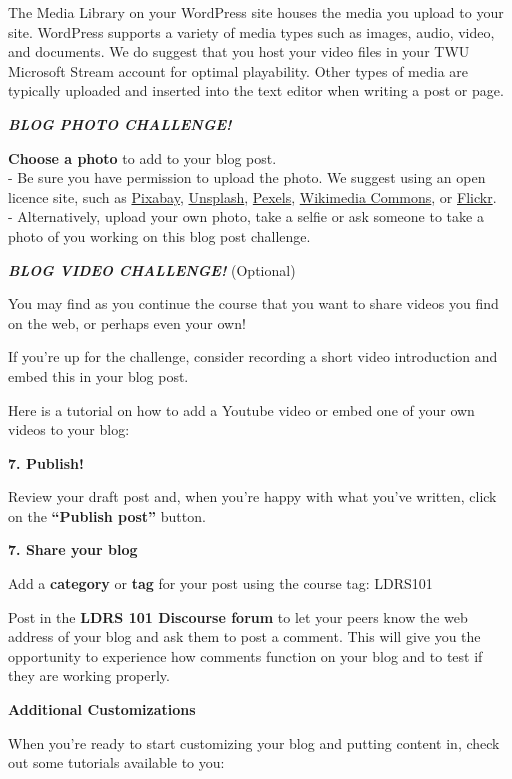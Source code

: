 \documentclass[
]{book}
\theoremstyle{definition}
\theoremstyle{definition}
\theoremstyle{definition}
\theoremstyle{definition}
\theoremstyle{remark}
\begin{document}
\begin{reflect}
The Media Library on your WordPress site houses the media you upload to your site. WordPress supports a variety of media types such as images, audio, video, and documents. We do suggest that you host your video files in your TWU Microsoft Stream account for optimal playability. Other types of media are typically uploaded and inserted into the text editor when writing a post or page.

\textbf{\emph{BLOG PHOTO CHALLENGE!}}

\textbf{Choose a photo} to add to your blog post.\\
- Be sure you have permission to upload the photo. We suggest using an open licence site, such as \href{https://pixabay.com/}{Pixabay}, \href{https://unsplash.com/}{Unsplash}, \href{https://www.pexels.com/}{Pexels}, \href{https://commons.wikimedia.org/wiki/Main_Page}{Wikimedia Commons}, or \href{https://www.flickr.com/search/?text=pho\&license=2\%2C3\%2C4\%2C5\%2C6\%2C9}{Flickr}.\\
- Alternatively, upload your own photo, take a selfie or ask someone to take a photo of you working on this blog post challenge.

\textbf{\emph{BLOG VIDEO CHALLENGE!}} (Optional)

You may find as you continue the course that you want to share videos you find on the web, or perhaps even your own!

If you're up for the challenge, consider recording a short video introduction and embed this in your blog post.

Here is a tutorial on how to add a Youtube video or embed one of your own videos to your blog:

\textbf{7. Publish!}

Review your draft post and, when you're happy with what you've written, click on the \textbf{``Publish post''} button.

\textbf{7. Share your blog}

Add a \textbf{category} or \textbf{tag} for your post using the course tag: LDRS101

Post in the \textbf{LDRS 101 Discourse forum} to let your peers know the web address of your blog and ask them to post a comment. This will give you the opportunity to experience how comments function on your blog and to test if they are working properly.

\textbf{Additional Customizations}

When you're ready to start customizing your blog and putting content in, check out some tutorials available to you:


\end{reflect}
\end{document}
